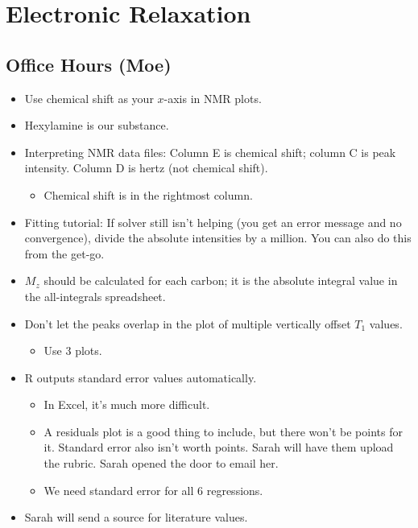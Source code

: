 \documentclass[../notes.tex]{subfiles}
\begin{document}
\chapter{Electronic Relaxation}
\section{Office Hours (Moe)}
\begin{itemize}
    \item {}Use chemical shift as your $x$-axis in NMR plots.
    \item Hexylamine is our substance.
    \item Interpreting NMR data files: Column E is chemical shift; column C is peak intensity. Column D is hertz (not chemical shift).
    \begin{itemize}
        \item Chemical shift is in the rightmost column.
    \end{itemize}
    \item Fitting tutorial: If solver still isn't helping (you get an error message and no convergence), divide the absolute intensities by a million. You can also do this from the get-go.
    \item $M_z$ should be calculated for each carbon; it is the absolute integral value in the all-integrals spreadsheet.
    \item Don't let the peaks overlap in the plot of multiple vertically offset $T_1$ values.
    \begin{itemize}
        \item Use 3 plots.
    \end{itemize}
    \item R outputs standard error values automatically.
    \begin{itemize}
        \item In Excel, it's much more difficult.
        \item A residuals plot is a good thing to include, but there won't be points for it. Standard error also isn't worth points. Sarah will have them upload the rubric. Sarah opened the door to email her.
        \item We need standard error for all 6 regressions.
    \end{itemize}
    \item Sarah will send a source for literature values.
\end{itemize}
\end{document}
